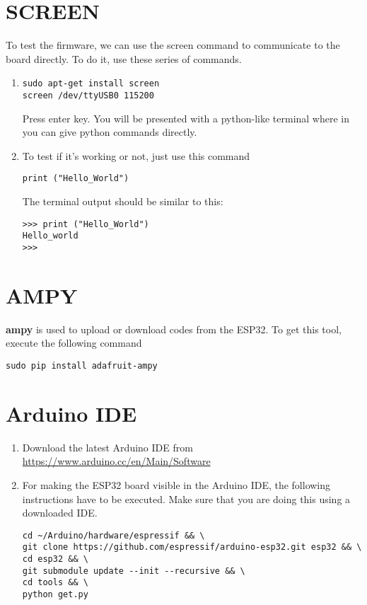 \documentclass[journal,12pt,twocolumn]{IEEEtran}
\begin{document}
\section{SCREEN}
To test the firmware, we can use the screen command to communicate to the board directly. To do it, use these series of commands.
\begin{enumerate}
\item

\begin{lstlisting}
sudo apt-get install screen
screen /dev/ttyUSB0 115200
\end{lstlisting}
Press enter key. You will be presented with a python-like terminal where in you can give python commands directly.
\item
To test if it's working or not, just use this command

\begin{lstlisting}
print ("Hello_World")
\end{lstlisting}
The terminal output should be similar to this:
\begin{lstlisting}
>>> print ("Hello_World")
Hello_world
>>>
\end{lstlisting}
\end{enumerate}
%
\section{AMPY}
\textbf{ampy} is used to upload or download codes from the ESP32.
To get this tool, execute the following command
\begin{lstlisting}
sudo pip install adafruit-ampy 
\end{lstlisting} 
\section{Arduino IDE}
\begin{enumerate}
\item Download the latest Arduino IDE from \href{https://www.arduino.cc/en/Main/Software}{https://www.arduino.cc/en/Main/Software}
\item For making the ESP32 board visible in the Arduino IDE, the following instructions have to be executed.  Make sure that you are doing this using a downloaded IDE.
\begin{lstlisting}
cd ~/Arduino/hardware/espressif && \
git clone https://github.com/espressif/arduino-esp32.git esp32 && \
cd esp32 && \
git submodule update --init --recursive && \
cd tools && \
python get.py
\end{lstlisting}

\end{enumerate}
\end{document}
